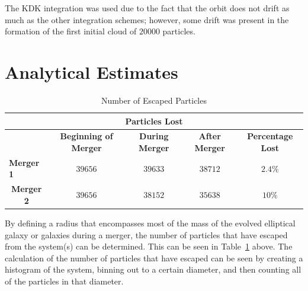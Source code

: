 \documentclass[12pt]{report}
\begin{document}
The KDK integration was used due to the fact that the orbit does not drift as much as the other integration schemes; however, some drift was present in the formation of the first initial cloud of $20000$ particles.



\section*{Analytical Estimates}


\begin{table}[h]
\begin{tabular}{@{}lcccc@{}}
\toprule
\multicolumn{5}{c}{\textbf{Particles Lost}} \\ \midrule
\multicolumn{1}{l|}{} & \multicolumn{1}{c|}{\textbf{Beginning of Merger}} & \multicolumn{1}{c|}{\textbf{During Merger}} & \multicolumn{1}{c|}{\textbf{After Merger}} & \multicolumn{1}{c|}{\textbf{Percentage Lost}} \\ \midrule
\multicolumn{1}{l|}{\textbf{Merger 1}} & $39656$ & $39633$ & $38712$ & \multicolumn{1}{c|}{$2.4\%$} \\ \midrule
\multicolumn{1}{c|}{\textbf{Merger 2}} & $39656$ & $38152$ & $35638$ & \multicolumn{1}{c|}{$10\%$} \\ \bottomrule
\end{tabular}
\caption{Number of Escaped Particles}
\label{tab:escapedparticles}
\end{table}


By defining a radius that encompasses most of the mass of the evolved elliptical galaxy or galaxies during a merger, the number of particles that have escaped from the system(s) can be determined. This can be seen in Table~\ref{tab:escapedparticles} above. The calculation of the number of particles that have escaped can be seen by creating a histogram of the system, binning out to a certain diameter, and then counting all of the particles in that diameter. 
\end{document}
